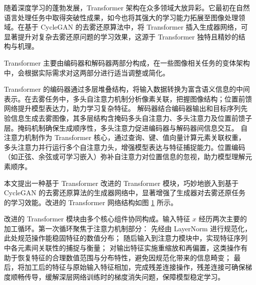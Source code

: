 随着深度学习的蓬勃发展，Transformer 架构在众多领域大放异彩。它最初在自然语言处理任务中取得突破性成果，如今也将其强大的学习能力拓展至图像处理领域。在基于 CycleGAN 的去雾还原算法中，将 Transformer 插入生成器网络，可显著提升对复杂去雾还原问题的学习效果，这源于 Transformer 独特且精妙的结构与机理。

Transformer 主要由编码器和解码器两部分构成，在一些图像相关任务的变体架构中，会根据实际需求对这两部分进行适当调整或简化。


Transformer 的编码器通过多层堆叠结构，将输入数据转换为富含语义信息的中间表示。在去雾任务中，多头自注意力机制分析像素关联，把握图像结构；位置前馈网络提升模型表达力，助力学习复杂特征。
解码器结合编码器输出和目标序列先验信息生成去雾图像，其多层结构含掩码多头自注意力、多头注意力及位置前馈子层。掩码机制确保生成顺序性，多头注意力促进编码器与解码器间信息交互。
自注意力机制作为 Transformer 核心，通过查询、键、值向量计算元素关联权重，多头注意力并行运行多个自注意力头，增强模型表达与特征捕捉能力。位置编码（如正弦、余弦或可学习嵌入）弥补自注意力对位置信息的忽视，助力模型理解元素顺序。

本文提出一种基于 Transformer 改进的 Transformer 模块，巧妙地嵌入到基于 CycleGAN 的去雾还原算法的生成器网络中，显著增强了生成器对去雾还原任务的学习效能。改进的 Transformer 网络结构如图 \ref{fig:transformer} 所示。

\begin{figure}[htb]
    \centering
    \captionsetup{font=footnotesize}
    \label{fig:transformer}
\end{figure}

改进的 Transformer 模块由多个核心组件协同构成。输入特征 $x$ 经历两次主要的加工循环。第一次循环聚焦于注意力机制部分：
先经由 LayerNorm 进行规范化，此处规范操作能稳固特征的数值分布；
随后输入到注意力模块中，实现特征序列中各元素间关联性的捕捉与衡量；
对输出特征实施重缩放和再偏置，这类操作有助于恢复特征的合理数值范围与分布特性，避免因规范化带来的信息畸变；
最后，将加工后的特征与原始输入特征相加，完成残差连接操作，残差连接可确保梯度顺畅传导，缓解深层网络训练时的梯度消失问题，保障模型稳定学习。

